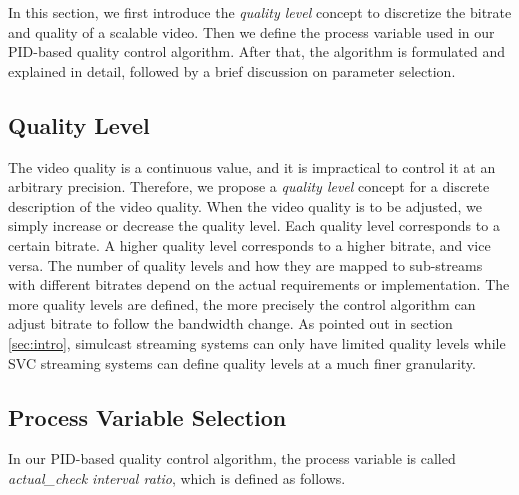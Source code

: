 \documentclass[journal,draftclsnofoot,onecolumn]{IEEEtran}
\begin{document}
In this section, we first introduce the \textit{quality level} concept to discretize the bitrate and quality of a scalable video. Then we define the process variable used in our PID-based quality control algorithm. After that, the algorithm is formulated and explained in detail, followed by a brief discussion on parameter selection.

\subsection{Quality Level}
\label{subsec:quality-level}

The video quality is a continuous value, and it is impractical to control it at an arbitrary precision. Therefore, we propose a \textit{quality level} concept for a discrete description of the video quality. When the video quality is to be adjusted, we simply increase or decrease the quality level. Each quality level corresponds to a certain bitrate. A higher quality level corresponds to a higher bitrate, and vice versa. The number of quality levels and how they are mapped to sub-streams with different bitrates depend on the actual requirements or implementation. The more quality levels are defined, the more precisely the control algorithm can adjust bitrate to follow the bandwidth change. As pointed out in section \ref{sec:intro}, simulcast streaming systems can only have limited quality levels while SVC streaming systems can define quality levels at a much finer granularity.

\subsection{Process Variable Selection}
\label{subsec:process-variable}

In our PID-based quality control algorithm, the process variable is called \textit{actual\_check interval ratio}, which is defined as follows.
\end{document}
